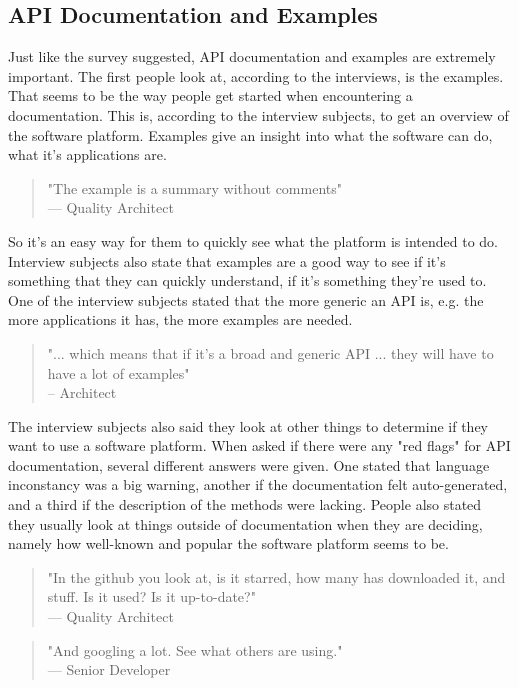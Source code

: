 \documentclass{cslthse-msc}
\begin{document}
    \subsection{API Documentation and Examples}
    Just like the survey suggested, API documentation and examples are extremely important. The first people look at, according to the interviews, is the examples. That seems to be the way people get started when encountering a documentation. This is, according to the interview subjects, to get an overview of the software platform. Examples give an insight into what the software can do, what it's applications are.
    \begin{quote}
        "The example is a summary without comments" \\
        --- Quality Architect
    \end{quote}
    So it's an easy way for them to quickly see what the platform is intended to do. Interview subjects also state that examples are a good way to see if it's something that they can quickly understand, if it's something they're used to. One of the interview subjects stated that the more generic an API is, e.g. the more applications it has, the more examples are needed.
    \begin{quote}
        "... which means that if it's a broad and generic API ... they will have to have a lot of examples" \\
        -- Architect
    \end{quote}
    The interview subjects also said they look at other things to determine if they want to use a software platform. When asked if there were any "red flags" for API documentation, several different answers were given. One stated that language inconstancy was a big warning, another if the documentation felt auto-generated, and a third if the description of the methods were lacking. People also stated they usually look at things outside of documentation when they are deciding, namely how well-known and popular the software platform seems to be.
    \begin{quote}
        "In the github you look at, is it starred, how many has downloaded it, and stuff. Is it used? Is it up-to-date?" \\
        --- Quality Architect
    \end{quote}
    \begin{quote}
        "And googling a lot. See what others are using."\\
        --- Senior Developer \\
    \end{quote}
\end{document}
